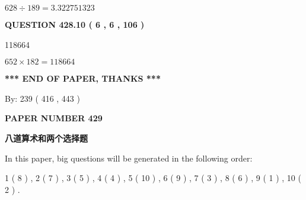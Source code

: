 \documentclass{ctexart}
\begin{document}
$ %
628 \div  %
189=   %
3.322751323$
 
 
  
\vspace{0.2in}
  
{\textbf{\Large{QUESTION
428.10 
 ( 6 , 6 , 106 )
}}}
  
  
 
 
\noindent{}

118664
 
 
 
 
\noindent{}

$ %
652 \times  %
182=   %
118664$
 
 
   
   
 \vspace{0.2in}
 
   
   
   
   
\vspace{1.0in} 
{\textbf{\large{ *** END OF PAPER, THANKS *** }}} 
   
   
\hspace{1.0in} By: 
 239 ( 416 ,  443 )
   
   
   
   
\newpage 
\setcounter{page}{ 
   429001 } 
   
   
   
   
 {\textbf{ \Large{ PAPER NUMBER  429  }}}
   
   
\vspace{0.2in}
   
   
   
   
   
   
 \vspace{0.2in}
{\LARGE {\textbf{ 八道算术和两个选择题}}}
   
   
   
\vspace{0.2in}
   
In this paper, big questions will be generated in the following order: 
   
   
   1 ( 8 )
 ,
   2 ( 7 )
 ,
   3 ( 5 )
 ,
   4 ( 4 )
 ,
   5 ( 10 )
 ,
   6 ( 9 )
 ,
   7 ( 3 )
 ,
   8 ( 6 )
 ,
   9 ( 1 )
 ,
   10 ( 2 )
 .
  
\vspace{0.2in}
  
\end{document}
